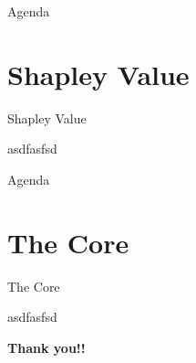 \documentclass{beamer}
\begin{document}
\begin{frame}[fragile]{Agenda}
  \section{Shapley Value}
  \tableofcontents[currentsection]
\end{frame}

\begin{frame}[fragile]{Shapley Value}
  \begin{block}{}
    asdfasfsd
  \end{block}
\end{frame}

\begin{frame}[fragile]{Agenda}
  \section{The Core}
  \tableofcontents[currentsection]
\end{frame}

\begin{frame}[fragile]{The Core}
  \begin{block}{}
    asdfasfsd
  \end{block}
\end{frame}

\begin{frame}
  \begin{center}
    \textbf{\huge{Thank you!!}}
    \end{center}
\end{frame}
\end{document}
